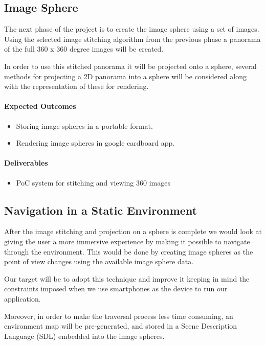 \subsection{Image Sphere}
\label{intro_subsec:3_2}

The next phase of the project is to create the image sphere using a set of images. Using the selected image stitching algorithm from the previous phase a panorama of the full 360 x 360 degree images will be created. 

In order to use this stitched panorama it will be projected onto a sphere, several methods for projecting a 2D panorama into a sphere will be considered along with the representation of these for rendering.

\paragraph{Expected Outcomes}
\begin{itemize}
\item{Storing image spheres in a portable format.}
\item{Rendering image spheres in google cardboard app.}
\end{itemize}

\paragraph{Deliverables}
\begin{itemize}
\item{PoC system for stitching and viewing 360 images}
\end{itemize}

\subsection{Navigation in a Static Environment}
\label{intro_subsec:3_3}

After the image stitching and projection on a sphere is complete we would look at giving the user a more immersive experience by making it possible to navigate through the environment. This would be done by creating image spheres as the point of view changes using the available image sphere data.

Our target will be to adopt this technique and improve it keeping in mind the constraints imposed when we use smartphones as the device to run our application.

Moreover, in order to make the traversal process less time consuming, an environment map will be pre-generated, and stored in a Scene Description Language (SDL) embedded into the image spheres.

